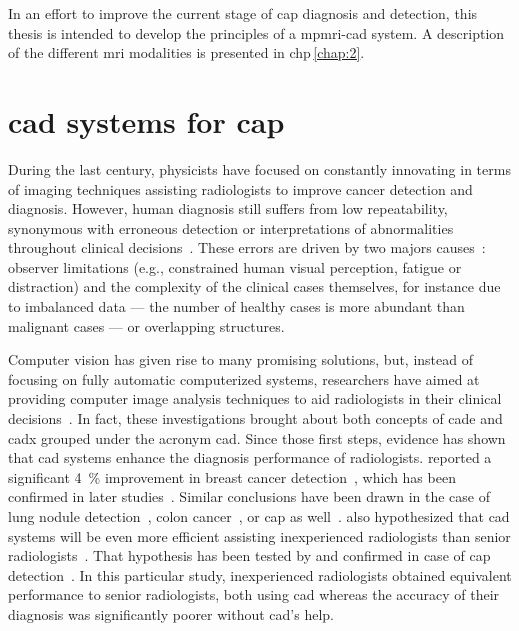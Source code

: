 In an effort to improve the current stage of \ac{cap} diagnosis and detection, this thesis is intended to develop the principles of a \ac{mpmri}-\acs{cad} system. 
A description of the different \ac{mri} modalities is presented in \acs{chp}\,\ref{chap:2}. 

\section{\acs*{cad} systems for \acs*{cap}}\label{sec:intro:cad} 
During the last century, physicists have focused on constantly innovating in terms of imaging techniques assisting radiologists to improve cancer detection and diagnosis.
However, human diagnosis still suffers from low repeatability, synonymous with erroneous detection or interpretations of abnormalities throughout clinical decisions~\cite{Giger2008,Hambrock2013}.
These errors are driven by two majors causes~\cite{Giger2008}: observer limitations (e.g., constrained human visual perception, fatigue or distraction) and the complexity of the clinical cases themselves, for instance due to imbalanced data --- the number of healthy cases is more abundant than malignant cases --- or overlapping structures.

Computer vision has given rise to many promising solutions, but, instead of focusing on fully automatic computerized systems, researchers have aimed at providing computer image analysis techniques to aid radiologists in their clinical decisions~\cite{Giger2008}.
In fact, these investigations brought about both concepts of \ac{cade} and \ac{cadx} grouped under the acronym \ac{cad}.
Since those first steps, evidence has shown that \ac{cad} systems enhance the diagnosis performance of radiologists.
\citeauthor{Chan1999} reported a significant \SI{4}{\percent} improvement in breast cancer detection~\cite{Chan1999}, which has been confirmed in later studies~\cite{Dean2006}.
Similar conclusions have been drawn in the case of lung nodule detection~\cite{Li2004}, colon cancer~\cite{Petrick2008}, or \ac{cap} as well~\cite{Hambrock2013}.
\citeauthor{Chan1999} also hypothesized that \acs{cad} systems will be even more efficient assisting inexperienced radiologists than senior radiologists~\cite{Chan1999}.
That hypothesis has been tested by \citeauthor{Hambrock2013} and confirmed in case of \ac{cap} detection~\cite{Hambrock2013}.
In this particular study, inexperienced radiologists obtained equivalent performance to senior radiologists, both using \acs{cad} whereas the accuracy of their diagnosis was significantly poorer without \ac{cad}'s help.

